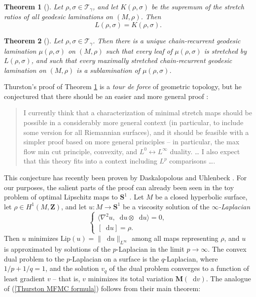 \documentclass[reqno,11pt]{amsart}
\newcommand{\ZZ}{\mathbf{Z}}
\newcommand{\Sph}{\mathbf S}
\newcommand*\dif{\mathop{}\!\mathrm{d}}
\newcommand{\Lip}{\mathrm{Lip}}
\newcommand{\Mass}{\mathbf M}
\newcommand{\dfn}[1]{\emph{#1}\index{#1}}
\newtheorem{theorem}{Theorem}[section]
\theoremstyle{definition}
\numberwithin{equation}{section}
\begin{document}
\begin{theorem}[{\cite{Thurston98}}]\label{Thurston MFMC}
Let $\rho, \sigma \in \mathscr T_\gamma$, and let $K(\rho, \sigma)$ be the supremum of the stretch ratios of all geodesic laminations on $(M, \rho)$.
Then 
\begin{equation}\label{Thurston MFMC formula}
L(\rho, \sigma) = K(\rho, \sigma).
\end{equation}
\end{theorem}

\begin{theorem}[{\cite{Thurston98}}]\label{Thurston canonical}
Let $\rho, \sigma \in \mathscr T_\gamma$.
Then there is a unique chain-recurrent geodesic lamination $\mu(\rho, \sigma)$ on $(M, \rho)$ such that every leaf of $\mu(\rho, \sigma)$ is stretched by $L(\rho, \sigma)$, and such that every maximally stretched chain-recurrent geodesic lamination on $(M, \rho)$ is a sublamination of $\mu(\rho, \sigma)$.
\end{theorem}

Thurston's proof of Theorem \ref{Thurston MFMC} is a \emph{tour de force} of geometric topology, but he conjectured that there should be an easier and more general proof \cite[Abstract]{Thurston98}:

\begin{quote}
I currently think that a characterization of minimal stretch maps should be possible in a considerably more general context (in particular, to include some version for all Riemannian surfaces), and it should be feasible with a simpler proof based on more general principles -- in particular, the max flow min cut principle, convexity, and $L^0 \leftrightarrow L^\infty$ duality. \dots
I also expect that this theory fits into a context including $L^p$ comparisons \dots. 
\end{quote}

This conjecture has recently been proven by Daskalopolous and Uhlenbeck \cite{daskalopoulos2022,daskalopoulos2023,uhlenbeck2023noether}.
For our purposes, the salient parts of the proof can already been seen in the toy problem of optimal Lipschitz maps to $\Sph^1$ \cite{daskalopoulos2020transverse}.
Let $M$ be a closed hyperbolic surface, let $\rho \in H^1(M, \ZZ)$, and let $u: M \to \Sph^1$ be a viscosity solution of the \dfn{$\infty$-Laplacian}
\begin{equation}\label{infinity laplacian}\begin{cases}
\langle \nabla^2 u, \dif u \otimes \dif u\rangle = 0, \\
[\dif u] = \rho.
\end{cases}\end{equation}
Then $u$ minimizes $\Lip(u) = \|\dif u\|_{L^\infty}$ among all maps representing $\rho$, and $u$ is approximated by solutions of the $p$-Laplacian in the limit $p \to \infty$.
The convex dual problem to the $p$-Laplacian on a surface is the $q$-Laplacian, where $1/p + 1/q = 1$, and the solution $v_q$ of the dual problem converges to a function of least gradient $v$ -- that is, $v$ minimizes its total variation $\Mass(\dif v)$.
The analogue of (\ref{Thurston MFMC formula}) follows from their main theorem:
\end{document}
